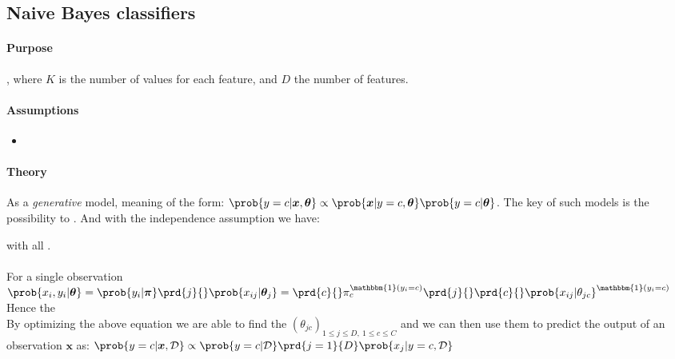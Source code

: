 \subsection{Naive Bayes classifiers}
\paragraph{Purpose}
, where $K$ is the number of values for
each feature, and $D$ the number of features.

\paragraph{Assumptions}
\begin{itemize}
    \item {}
\end{itemize}

\paragraph{Theory}
As a \emph{generative} model, meaning of the form:
$\prob{y=c|\bm{x}, \bm{\theta}} \propto \prob{\bm{x}|y=c,\bm{\theta}}
\prob{y=c|\bm{\theta}}$. The key of such models is the possibility
to . And with the independence assumption we 
have:
\begin{center}
\end{center}
with all .\\
\\
For a single observation
$\prob{x_{i}, y_{i}|\bm{\theta}} = \prob{y_{i}|\bm{\pi}}\prd{j}{}\prob{x_{ij}|\bm{\theta}_{j}} = 
\prd{c}{}\pi_{c}^{\mathbbm{1}(y_{i}=c)}\prd{j}{}\prd{c}{}\prob{x_{ij}|
\theta_{jc}}^{\mathbbm{1}(y_{i}=c)}
$\\ 
Hence the \\
By optimizing the above equation we are able to find the $\left(\theta_{jc}\right)_{1\leq j \leq D,~ 1\leq c\leq C}$ and we can then use them to
predict the output of an observation $\bm{x}$ as: $\prob{y=c|\bm{x},\mathcal{D}} \propto \prob{y=c|\mathcal{D}}\prd{j=1}{D}\prob{x_{j}|y=c,\mathcal{D}}$

